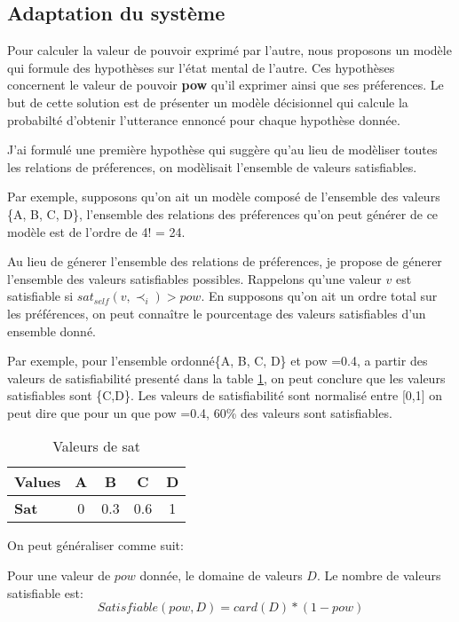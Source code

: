 \documentclass{llncs}
\begin{document}
	
	\subsection{Adaptation du syst\`eme}
	Pour calculer la valeur de pouvoir exprim\'e par l'autre, nous proposons un mod\`ele qui formule des hypoth\`eses sur l'\'etat mental de l'autre. Ces hypoth\`eses concernent le valeur de pouvoir \textbf{pow} qu'il exprimer ainsi que ses pr\'eferences. 
	Le but de cette solution est de pr\'esenter un mod\`ele d\'ecisionnel qui calcule la probabilt\'e d'obtenir l'utterance ennonc\'e pour chaque hypoth\`ese donnée. 
	
	J'ai formul\'e une premi\`ere hypoth\`ese  qui sugg\`ere qu'au lieu de mod\`eliser toutes les relations de pr\'eferences, on mod\`elisait l'ensemble de valeurs satisfiables.
	
	Par exemple, supposons qu'on ait un mod\`ele compos\'e de l'ensemble des valeurs \{A, B, C, D\}, l'ensemble des relations des pr\'eferences qu'on peut g\'en\'erer de ce mod\`ele est de l'ordre de 4! = 24. 
	
	Au lieu de g\'enerer l'ensemble des relations de pr\'eferences, je propose de g\'enerer l'ensemble des valeurs satisfiables possibles. 
	Rappelons qu'une valeur $v$ est satisfiable si $ sat_{self}(v, \prec_i) > pow$. En supposons qu'on ait un ordre total sur les pr\'ef\'erences, on peut conna\^itre le pourcentage des valeurs satisfiables d'un ensemble donn\'e. 
	
	Par exemple, pour l'ensemble ordonn\'e\{A, B, C, D\} et pow =0.4, a partir des valeurs de satisfiabilit\'e present\'e dans la table \ref{table:conditions}, on peut conclure que les valeurs satisfiables sont \{C,D\}. 
	Les valeurs de satisfiabilit\'e sont normalis\'e entre [0,1] on peut dire que pour un que pow =0.4, 60\% des valeurs  sont satisfiables.
	\begin{table}[h]
		\centering
		\begin{tabular}{ |l|c|c|c|c| }
			\hline
			\textbf{Values}& \textbf{A} & \textbf{B} & \textbf{C} & \textbf{D}\\ 
			\hline
			\newline  \textbf{Sat }& 0 & 0.3 & 0.6 & 1\\ 
			\hline
			
		\end{tabular}
		\caption{Valeurs de sat}
		\label{table:conditions}
	\end{table}
	On peut g\'en\'eraliser comme suit:
	
	Pour une valeur de $pow$ donn\'ee, le domaine de valeurs $D$. Le nombre de valeurs satisfiable est:
	\begin{equation}
	Satisfiable(pow, D)= card(D) * (1-pow)
	\end{equation}
	
\end{document}
